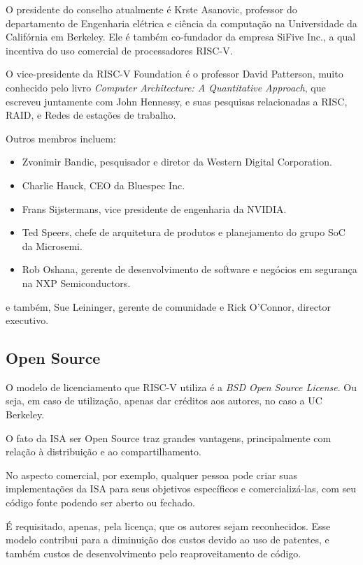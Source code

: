 		O presidente do conselho atualmente é Krste Asanovic, professor do departamento de Engenharia elétrica e ciência da computação na Universidade da Califórnia em Berkeley. Ele é também co-fundador da empresa SiFive Inc., a qual incentiva do uso comercial de processadores RISC-V.\

		O vice-presidente da RISC-V Foundation é o professor David Patterson, muito conhecido pelo livro \textit{Computer Architecture: A Quantitative Approach}, que escreveu juntamente com John Hennessy, e suas pesquisas relacionadas a RISC, RAID, e Redes de estações de trabalho.\

		Outros membros incluem:\
		\begin{itemize}  
			\item Zvonimir Bandic, pesquisador e diretor da Western Digital Corporation. 
			\item Charlie Hauck, CEO da Bluespec Inc.
			\item Frans Sijstermans, vice presidente de engenharia da NVIDIA.
			\item Ted Speers, chefe de arquitetura de produtos e planejamento do grupo SoC da Microsemi.
			\item Rob Oshana, gerente de desenvolvimento de software e negócios em segurança na NXP Semiconductors. 
		\end{itemize}

		e também, Sue Leininger, gerente de comunidade e Rick O’Connor, director executivo.~\cite{riscv_fboardmembers}

	\subsection{Open Source}
		
		O modelo de licenciamento que RISC-V utiliza é a \textit{BSD Open Source License}. Ou seja, em caso de utilização, apenas dar créditos aos autores, no caso a UC Berkeley.~\cite{riscv_faq}

		O fato da ISA ser Open Source traz grandes vantagens, principalmente com relação à distribuição e ao compartilhamento.
		
		No aspecto comercial, por exemplo, qualquer pessoa pode criar suas implementações da ISA para seus objetivos específicos e comercializá-las, com seu código fonte podendo ser aberto ou fechado.

		É requisitado, apenas, pela licença, que os autores sejam reconhecidos. Esse modelo contribui para a diminuição dos custos devido ao uso de patentes, e também custos de desenvolvimento pelo reaproveitamento de código.


